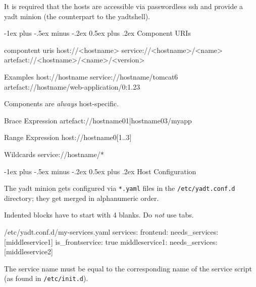 \documentclass[10pt,landscape]{article}
\makeatletter
\renewcommand{\section}{\@startsection{section}{1}{0mm}%
                                {-1ex plus -.5ex minus -.2ex}%
                                {0.5ex plus .2ex}%
                                {\normalfont\large\bfseries}}
\newcommand{\note}[2][Note]{
\begin{description}[font=\bfseries,leftmargin=1cm,style=sameline]
    \item [{#1}] {#2}
\end{description}
}
\makeatother
\begin{document}
\begin{multicols}{3}
\note{It is required that the hosts are accessible
via passwordless ssh and provide a yadt minion (the counterpart to the yadtshell).}



\section{Component URIs}

\begin{commands}{compontent uris}
host://<hostname>
service://<hostname>/<name>
artefact://<hostname>/<name>/<version>
\end{commands}

\begin{examples}{Examples}
host://hostname
service://hostname/tomcat6
artefact://hostname/web-application/0:1.23
\end{examples}

\note{Components are \emph{always} host-specific.}

\begin{examples}{Brace Expression}
artefact://{hostname01|hostname03}/myapp
\end{examples}

\begin{examples}{Range Expression}
host://hostname0[1..3]
\end{examples}

\begin{examples}{Wildcards}
service://hostname/*
\end{examples}



\section{Host Configuration}

The yadt minion gets configured via \verb+*.yaml+ files in the
\verb+/etc/yadt.conf.d+ directory; they get merged in alphanumeric order.

\note{Indented blocks have to start with 4 blanks. Do \emph{not} use tabs.}

\begin{examples}[showspaces=true]{/etc/yadt.conf.d/my-services.yaml}
services:
    frontend:
        needs_services: [middleservice1]
        is_frontservice: true
    middleservice1:
        needs_services: [middleservice2]
\end{examples}

The service name must be equal to the corresponding name of the
service script (as found in \verb+/etc/init.d+).


\end{multicols}
\end{document}
